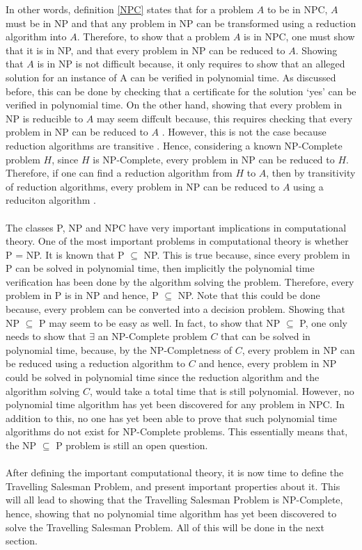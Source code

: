 \documentclass[12pt]{article}
\numberwithin{equation}{subsection}
\numberwithin{table}{subsection}
\begin{document}
In other words, definition \ref{NPC} states that for a problem $\mathit{A}$ to be in NPC, $\mathit{A}$ must be in NP and that any problem in NP can be transformed using a reduction algorithm into $\mathit{A}$. Therefore, to show that a problem $\mathit{A}$ is in NPC, one must show that it is in NP, and that every problem in NP can be reduced to $\mathit{A}$. Showing that $\mathit{A}$ is in NP is not difficult because, it only requires to show that an alleged solution for an instance of A can be verified in polynomial time. As discussed before, this can be done by checking that a certificate for the solution `yes' can be verified in polynomial time. On the other hand, showing that every problem in NP is reducible to $\mathit{A}$ may seem diffcult because, this requires checking that every problem in NP can be reduced to $\mathit{A}$ \cite{geeksforgeeks_2018_2}. However, this is not the case because reduction algorithms are transitive \cite{geeksforgeeks_2018_2}. Hence, considering a known NP-Complete problem $\mathit{H}$, since $\mathit{H}$ is NP-Complete, every problem in NP can be reduced to $\mathit{H}$. Therefore, if one can find a reduction algorithm from $\mathit{H}$ to $\mathit{A}$, then by transitivity of reduction algorithms, every problem in NP can be reduced to $\mathit{A}$ using a reduciton algorithm \cite{geeksforgeeks_2018_2}.\\\\
The classes P, NP and NPC have very important implications in computational theory. One of the most important problems in computational theory is whether P = NP. It is known that P $\subseteq$ NP. This is true because, since every problem in P can be solved in polynomial time, then implicitly the polynomial time verification has been done by the algorithm solving the problem. Therefore, every problem in P is in NP and hence, P $\subseteq$ NP. Note that this could be done because, every problem can be converted into a decision problem. Showing that NP $\subseteq$ P may seem to be easy as well. In fact, to show that NP $\subseteq$ P, one only needs to show that $\exists$ an NP-Complete problem $\mathit{C}$ that can be solved in polynomial time, because, by the NP-Completness of $\mathit{C}$, every problem in NP can be reduced using a reduction algorithm to $\mathit{C}$ and hence, every problem in NP could be solved in polynomial time since the reduction algorithm and the algorithm solving $\mathit{C}$, would take a total time that is still polynomial. However, no polynomial time algorithm has yet been discovered for any problem in NPC. In addition to this, no one has yet been able to prove that such polynomial time algorithms do not exist for NP-Complete problems. This essentially means that, the NP $\subseteq$ P problem is still an open question. \cite{cormen_leiserson_rivest_stein}\\\\
After defining the important computational theory, it is now time to define the Travelling Salesman Problem, and present important properties about it. This will all lead to showing that the Travelling Salesman Problem is NP-Complete, hence, showing that no polynomial time algorithm has yet been discovered to solve the Travelling Salesman Problem. All of this will be done in the next section.
\newpage
\end{document}
